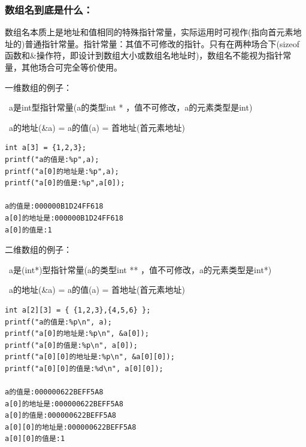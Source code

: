 \documentclass[zihao=-4,UTF8]{report}
\begin{document}
\subsubsection{数组名到底是什么：}
数组名本质上是地址和值相同的特殊指针常量，实际运用时可视作{\color{red}(指向首元素地址的)普通指针常量。}{\color{gray}\small 指针常量：其值不可修改的指针。只有在两种场合下(sizeof函数和\&操作符，即设计到数组大小或数组名地址时)，数组名不能视为指针常量，其他场合可完全等价使用。}\par
一维数组的例子：\par
{}\ a是int型指针常量(a的类型int * ，值不可修改，a的元素类型是int)\par
{}\ a的地址(\&a) = a的值(a) = 首地址(首元素地址)
\begin{lstlisting}
int a[3] = {1,2,3};     
printf("a的值是:%p",a);
printf("a[0]的地址是:%p",a);
printf("a[0]的值是:%p",a[0]);

a的值是:000000B1D24FF618
a[0]的地址是:000000B1D24FF618
a[0]的值是:1
\end{lstlisting}\par
二维数组的例子：\par
{}\ a是(int*)型指针常量(a的类型int ** ，值不可修改，a的元素类型是int*)
\par
{}\ a的地址(\&a) = a的值(a) = 首地址(首元素地址)
\begin{lstlisting}
int a[2][3] = { {1,2,3},{4,5,6} };
printf("a的值是:%p\n", a);
printf("a[0]的地址是:%p\n", &a[0]);
printf("a[0]的值是:%p\n", a[0]);
printf("a[0][0]的地址是:%p\n", &a[0][0]);
printf("a[0][0]的值是:%d\n", a[0][0]);

a的值是:000000622BEFF5A8
a[0]的地址是:000000622BEFF5A8
a[0]的值是:000000622BEFF5A8
a[0][0]的地址是:000000622BEFF5A8
a[0][0]的值是:1
\end{lstlisting}
\end{document}

